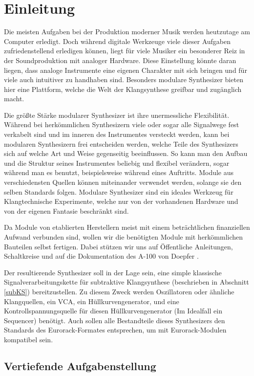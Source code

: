 \chapter{Einleitung}

Die meisten Aufgaben bei der Produktion moderner Musik werden heutzutage am Computer erledigt. Doch während digitale Werkzeuge viele dieser Aufgaben zufriedenstellend erledigen können, liegt für viele Musiker ein besonderer Reiz in der Soundproduktion mit analoger Hardware. Diese Einstellung könnte daran liegen, dass analoge Instrumente eine eigenen Charakter mit sich bringen und für viele auch intuitiver zu handhaben sind. Besonders modulare Synthesizer bieten hier eine Plattform, welche die Welt der Klangsynthese greifbar und zugänglich macht.

Die größte Stärke modularer Synthesizer ist ihre unermessliche Flexibilität. Während bei herkömmlichen Synthesizern viele oder sogar alle Signalwege fest verkabelt sind und im inneren des Instrumentes versteckt werden, kann bei modularen Synthesizern frei entscheiden werden, welche Teile des Synthesizers sich auf welche Art und Weise gegenseitig beeinflussen. So kann man den Aufbau und die Struktur seines Instrumentes beliebig und flexibel verändern, sogar während man es benutzt, beispielsweise während eines Auftritts. Module aus verschiedensten Quellen können miteinander verwendet werden, solange sie den selben Standards folgen. Modulare Synthesizer sind ein ideales Werkzeug für Klangtechnische Experimente, welche nur von der vorhandenen Hardware und von der eigenen Fantasie beschränkt sind.

Da Module von etablierten Herstellern meist mit einem beträchtlichen finanziellen Aufwand verbunden sind, wollen wir die benötigten Module mit herkömmlichen Bauteilen selbst fertigen. Dabei stützen wir uns auf Öffentliche Anleitungen, Schaltkreise und auf die Dokumentation des A-100 von Doepfer \cite{doepfer:A-100}.

Der resultierende Synthesizer soll in der Lage sein, eine simple klassische Signalverarbeitungskette für subtraktive Klangsynthese (beschrieben in Abschnitt \ref{subKS}) bereitzustellen. Zu diesem Zweck werden Oszillatoren oder ähnliche Klangquellen, ein \ac{VCA}, ein Hüllkurvengenerator, und eine Kontrollspannungsquelle für diesen Hüllkurvengenerator (Im Idealfall ein Sequencer) benötigt. Auch sollen alle Bestandteile dieses Synthesizers den Standards des Eurorack-Formates entsprechen, um mit Eurorack-Modulen kompatibel sein.

\section{Vertiefende Aufgabenstellung}

